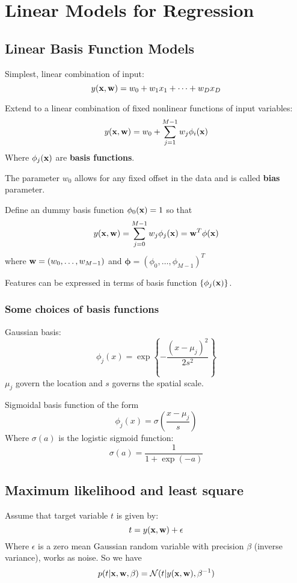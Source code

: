\chapter{Linear Models for Regression}
\section{Linear Basis Function Models}
Simplest, linear combination of input:
\begin{equation}
    y(\mathbf{x}, \mathbf{w}) = w_0 + w_1 x_1 + \dots + w_D x_D
\end{equation}

Extend to a linear combination of fixed nonlinear functions of input
variables:
\begin{equation}
    y(\mathbf{x}, \mathbf{w}) = w_0 + \sum_{j=1}^{M-1} w_j \phi_i(\mathbf{x})
\end{equation}
Where $\phi_j(\mathbf{x})$ are \textbf{basis functions}.

The parameter $w_0$ allows for any fixed offset in the data and is called
\textbf{bias} parameter.

Define an dummy basis function $\phi_0(\mathbf{x}) = 1$ so that 
\begin{equation}
    y(\mathbf{x}, \mathbf{w}) = \sum_{j=0}^{M-1}w_j \phi_j(\mathbf{x}) = \mathbf{w}^T \phi(\mathbf{x})
\end{equation}
where $\mathbf{w} = (w_0, \dots, w_{M-1})$ and $\boldsymbol\phi = (\phi_0, \dots,
\phi_{M-1})^T$

Features can be expressed in terms of basis function $\{\phi_j(\mathbf{x})\}$.

\subsection{Some choices of basis functions}
Gaussian basis:
\begin{equation}
    \phi_j(x) = \exp\left\{ -\frac{(x-\mu_j)^2}{2s^2} \right\}
\end{equation}
$\mu_j$ govern the location and $s$ governs the spatial scale.

Sigmoidal basis function of the form
\begin{equation}
    \phi_j(x) = \sigma\left( \frac{x-\mu_j}{s} \right)
\end{equation}
Where $\sigma(a)$ is the logistic sigmoid function:
\begin{equation}
    \sigma(a) = \frac{1}{1+\exp(-a)}
\end{equation}

\section{Maximum likelihood and least square}
Assume that target variable $t$ is given by:
\begin{equation}
    t = y(\mathbf{x}, \mathbf{w}) + \epsilon
\end{equation}
Where $\epsilon$ is a zero mean Gaussian random variable with precision
$\beta$ (inverse variance), works as noise. So we have
\begin{equation}
    p(t|\mathbf{x}, \mathbf{w}, \beta) = \mathcal{N}(t|y(\mathbf{x}, \mathbf{w}), \beta^{-1})
\end{equation}

